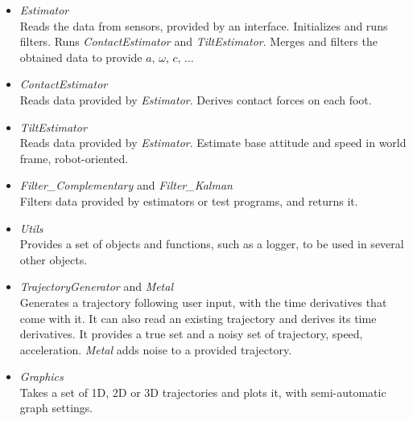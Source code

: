 \documentclass[a4paper,10pt]{article}
\begin{document}
\begin{itemize}
	\item{\textit{Estimator} \\
	Reads the data from sensors, provided by an interface. Initializes and runs filters. Runs \textit{ContactEstimator} and \textit{TiltEstimator}. Merges and filters the obtained data to provide $a$, $\omega$, $c$, ...}
	\item{\textit{ContactEstimator} \\
	Reads data provided by \textit{Estimator}. Derives contact forces on each foot.
	}
	\item{\textit{TiltEstimator} \\
	Reads data provided by \textit{Estimator}. Estimate base attitude and speed in world frame, robot-oriented.
	}
	\item{\textit{Filter\_Complementary} and \textit{Filter\_Kalman} \\
	Filters data provided by estimators or test programs, and returns it.
	}
	\item{\textit{Utils}\\
	Provides a set of objects and functions, such as a logger, to be used in several other objects.
	}
	\item{\textit{TrajectoryGenerator} and \textit{Metal}\\
	Generates a trajectory following user input, with the time derivatives that come with it. It can also read an existing trajectory and derives its time derivatives. It provides a true set and a noisy set of trajectory, speed, acceleration.
	\textit{Metal} adds noise to a provided trajectory.
	}
	\item{\textit{Graphics}\\
	Takes a set of 1D, 2D or 3D trajectories and plots it, with semi-automatic graph settings. }
\end{itemize}
\end{document}
